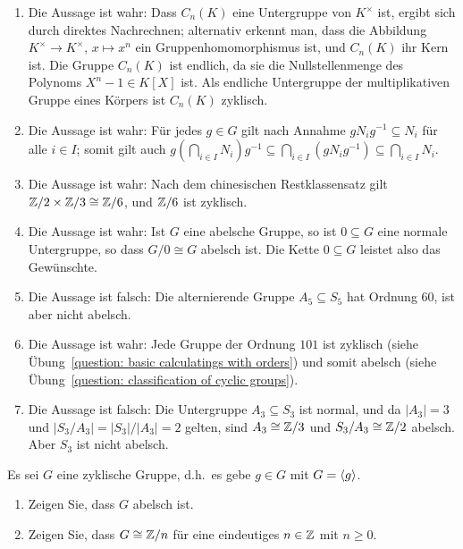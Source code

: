 \begin{solution}
  \begin{enumerate}
    \item
      Die Aussage ist wahr:
      Dass $C_n(K)$ eine Untergruppe von $K^\times$ ist, ergibt sich durch direktes Nachrechnen;
      alternativ erkennt man, dass die Abbildung $K^\times \to K^\times$, $x \mapsto x^n$ ein Gruppenhomomorphismus ist, und $C_n(K)$ ihr Kern ist.
      Die Gruppe $C_n(K)$ ist endlich, da sie die Nullstellenmenge des Polynoms $X^n - 1 \in K[X]$ ist.
      Als endliche Untergruppe der multiplikativen Gruppe eines Körpers ist $C_n(K)$ zyklisch.
    \item
      Die Aussage ist wahr:
      Für jedes $g \in G$ gilt nach Annahme $g N_i g^{-1} \subseteq N_i$ für alle $i \in I$;
      somit gilt auch $g \left( \bigcap_{i \in I} N_i \right) g^{-1} \subseteq \bigcap_{i \in I} (g N_i g^{-1}) \subseteq \bigcap_{i \in I} N_i$.
    \item
      Die Aussage ist wahr:
      Nach dem chinesischen Restklassensatz gilt $\mathbb{Z}/2 \times \mathbb{Z}/3 \cong \mathbb{Z}/6$, und $\mathbb{Z}/6$ ist zyklisch.
    \item
      Die Aussage ist wahr:
      Ist $G$ eine abelsche Gruppe, so ist $0 \subseteq G$ eine normale Untergruppe, so dass $G/0 \cong G$ abelsch ist.
      Die Kette $0 \subseteq G$ leistet also das Gewünschte.
    \item
      Die Aussage ist falsch:
      Die alternierende Gruppe $A_5 \subseteq S_5$ hat Ordnung $60$, ist aber nicht abelsch.
    \item
      Die Aussage ist wahr:
      Jede Gruppe der Ordnung $101$ ist zyklisch (siehe Übung~\ref{question: basic calculatings with orders}) und somit abelsch (siehe Übung~\ref{question: classification of cyclic groups}).
    \item
      Die Aussage ist falsch:
      Die Untergruppe $A_3 \subseteq S_3$ ist normal, und da $|A_3| = 3$ und $|S_3/A_3| = |S_3|/|A_3| = 2$ gelten, sind $A_3 \cong \mathbb{Z}/3$ und $S_3/A_3 \cong \mathbb{Z}/2$ abelsch.
      Aber $S_3$ ist nicht abelsch.
  \end{enumerate}
\end{solution}


\begin{question}[subtitle = Klassifikation zyklischer Gruppen]
  Es sei $G$ eine zyklische Gruppe, d.h.\ es gebe $g \in G$ mit $G = \langle g\rangle$.
  \begin{enumerate}
    \item
      Zeigen Sie, dass $G$ abelsch ist.
    \item
      Zeigen Sie, dass $G \cong \mathbb{Z}/n$ für eine eindeutiges $n \in \mathbb{Z}$ mit $n \geq 0$.
  \end{enumerate}
\end{question}


